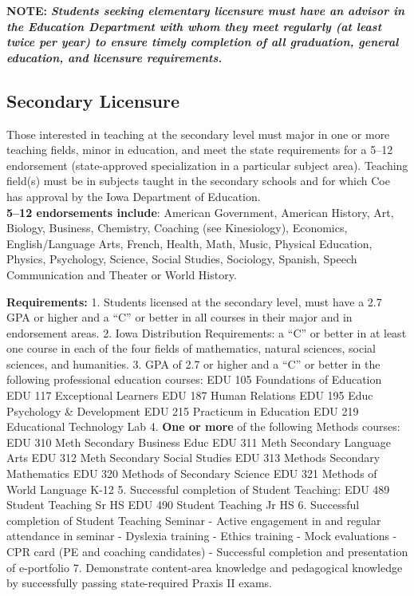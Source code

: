 \documentclass[
  letterpaper,
]{scrbook}
\begin{document}
\textbf{NOTE:} \textbf{\emph{Students seeking elementary licensure must
have an advisor in the Education Department with whom they meet
regularly (at least twice per year) to ensure timely completion of all
graduation, general education, and licensure requirements.}}

\hypertarget{secondary-licensure}{%
\subsection{Secondary Licensure}\label{secondary-licensure}}

Those interested in teaching at the secondary level must major in one or
more teaching fields, minor in education, and meet the state
requirements for a 5--12 endorsement (state-approved specialization in a
particular subject area). Teaching field(s) must be in subjects taught
in the secondary schools and for which Coe has approval by the Iowa
Department of Education.\\
\textbf{5--12 endorsements include}: American Government, American
History, Art, Biology, Business, Chemistry, Coaching (see Kinesiology),
Economics, English/Language Arts, French, Health, Math, Music, Physical
Education, Physics, Psychology, Science, Social Studies, Sociology,
Spanish, Speech Communication and Theater or World History.

\textbf{Requirements:} 1. Students licensed at the secondary level, must
have a 2.7 GPA or higher and a ``C'' or better in all courses in their
major and in endorsement areas. 2. Iowa Distribution Requirements: a
``C'' or better in at least one course in each of the four fields of
mathematics, natural sciences, social sciences, and humanities. 3. GPA
of 2.7 or higher and a ``C'' or better in the following professional
education courses: EDU 105 Foundations of Education EDU 117 Exceptional
Learners EDU 187 Human Relations EDU 195 Educ Psychology \& Development
EDU 215 Practicum in Education EDU 219 Educational Technology Lab 4.
\textbf{One or more} of the following Methods courses: EDU 310 Meth
Secondary Business Educ EDU 311 Meth Secondary Language Arts EDU 312
Meth Secondary Social Studies EDU 313 Methods Secondary Mathematics EDU
320 Methods of Secondary Science EDU 321 Methods of World Language K-12
5. Successful completion of Student Teaching: EDU 489 Student Teaching
Sr HS EDU 490 Student Teaching Jr HS 6. Successful completion of Student
Teaching Seminar - Active engagement in and regular attendance in
seminar - Dyslexia training - Ethics training - Mock evaluations - CPR
card (PE and coaching candidates) - Successful completion and
presentation of e-portfolio 7. Demonstrate content-area knowledge and
pedagogical knowledge by successfully passing state-required Praxis II
exams.
\end{document}
